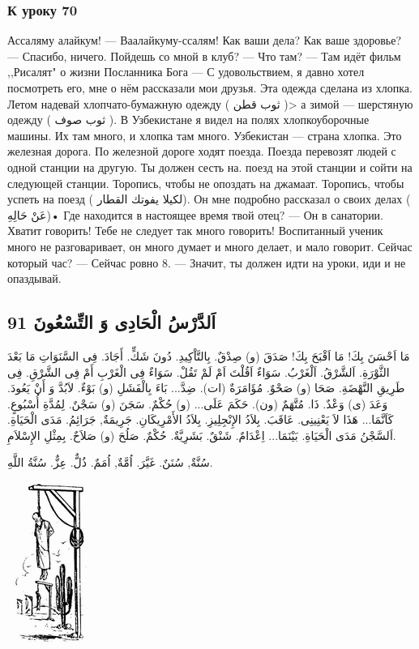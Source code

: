 \documentclass[a5paper]{article}
\begin{document}
\subsubsection{К уроку 70}
Ассаляму алайкум! — Ваалайкуму-ссалям! Как ваши дела? Как ваше здоровье? — Спасибо, ничего. Пойдешь со мной в клуб? — Что там? — Там идёт фильм ,,Рисалят" о жизни Посланника Бога — С удовольствием, я давно хотел посмотреть его, мне о нём рассказали мои друзья. Эта одежда сделана из хлопка. Летом надевай хлопчато-­бумажную одежду ( ثوب قطن )> а зимой — шерстяную одежду ( ثوب صوف ). В Узбекистане я видел на полях хлопкоуборочные машины. Их там много, и хлопка там много. Узбекистан — страна хлопка. Это железная дорога. По железной дороге ходят поезда. Поезда перевозят людей с одной станции на другую. Ты должен сесть на. поезд на этой станции и сойти на следующей станции. Торопись, чтобы не опоздать на джамаат. Торопись, чтобы успеть на поезд ( لكيلا يفوتك القطار). Он мне подробно рассказал о своих делах ( عَنْ حَالِهِ)• Где находится в настоящее время твой отец? — Он в санатории. Хватит говорить! Тебе не следует так много говорить! Воспитанный ученик много не разговаривает, он много думает и много делает, и мало говорит. Сейчас который час? — Сейчас ровно 8. — Значит, ты должен идти на уроки, иди и не опаздывай.

\subsection[اَلدَّرْسُ الْحَادِى وَ التِّسْعُونَ 91]{اَلدَّرْسُ الْحَادِى وَ التِّسْعُونَ 91}
مَا اَحْسَنَ بِكَ! مَا اَقْبَحَ بِكَ! صَدَقَ (و) صِدْقٌ. بِالتَّاْكِيدِ. دُونَ شَكٍّ. أَجَادَ. فِى السَّنَوَاتِ مَا بَعْدَ الثَّوْرَةِ. اَلشَّرْقُ. اَلْغَرْبُ. سَوَاءٌ اَقُلْتَ اَمْ لَمْ تَقُلْ. سَوَاءٌ فِى الْغَرْبِ أَمْ فِى الشَّرْقِ. فِى طَرِيقِ النَّهْضَةِ. صَحَا (و) صَحْوٌ. مُؤَامَرَةٌ (ات). ضِدَّ... بَاءَ بِالْفَشَلِ (و) بَوْءٌ. لاَبُدَّ وَ أَنْ يَعُودَ. وَعَدَ (ى) وَعْدٌ. ذَا. مُتَّهَمٌ (ون). حَكَمَ عَلَى... (و) حُكْمٌ. سَجَنَ (و) سَجْنٌ. لِمُدَّةِ أُسْبُوعٍ. كَاَنَّمَا... هَذَا لاَ يَعْنِينِى. عَاقَبَ. بِلاَدُ الإِنْجِلِيزِ. بِلاَدُ الأَمْرِيكَانِ. جَرِيمَةٌ, جَرَائِمُ. مَدَى الْحَيَاةِ. اَلسَّجْنُ مَدَى الْحَيَاةِ. بَيْنَمَا... اِعْدَامٌ. شَنْقٌ. بَشَرِيَّةٌ. حُكْمٌ. صَلُحَ (و) صَلاَحٌ. بِمِثْلِ الإِسْلاَمِ. 

سُنَّةٌ, سُنَنٌ. غَيَّرَ. اُمَّةٌ, اُمَمٌ. ذُلٌّ. عِزٌّ. سُنَّةُ اللَّهِ. 

\  \includegraphics[width=0.948in,height=2.0626in]{MuhammadBagauddinlatinized-img254.png} 
\end{document}
